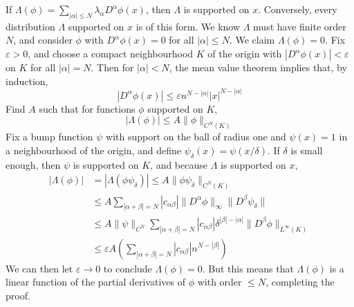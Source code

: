 \begin{example}
    If $\Lambda(\phi) = \sum_{|\alpha| \leq N} \lambda_\alpha D^\alpha \phi(x)$, then $\Lambda$ is supported on $x$. Conversely, every distribution $\Lambda$ supported on $x$ is of this form. We know $\Lambda$ must have finite order $N$, and consider $\phi$ with $D^\alpha \phi(x) = 0$ for all $|\alpha| \leq N$. We claim $\Lambda(\phi) = 0$. Fix $\varepsilon > 0$, and choose a compact neighbourhood $K$ of the origin with $|D^\alpha \phi(x)| < \varepsilon$ on $K$ for all $|\alpha| = N$. Then for $|\alpha| < N$, the mean value theorem implies that, by induction,
    \[ |D^\alpha \phi(x)| \leq \varepsilon n^{N - |\alpha|} |x|^{N-|\alpha|} \]
    Find $A$ such that for functions $\phi$ supported on $K$,
    \[ |\Lambda(\phi)| \leq A \| \phi \|_{C^N(K)} \]
    Fix a bump function $\psi$ with support on the ball of radius one and $\psi(x) = 1$ in a neighbourhood of the origin, and define $\psi_\delta(x) = \psi(x/\delta)$. If $\delta$ is small enough, then $\psi$ is supported on $K$, and because $\Lambda$ is supported on $x$,
    \begin{align*}
        |\Lambda(\phi)| &= |\Lambda(\phi \psi_\delta)| \leq A \| \phi \psi_\delta \|_{C^N(K)}\\
        &\leq A \sum_{|\alpha + \beta| = N} |c_{\alpha \beta}| \| D^\alpha \phi \|_\infty \| D^\beta \psi_\delta \|\\
        &\leq A \| \psi \|_{C^N} \sum_{|\alpha + \beta| = N} |c_{\alpha \beta}| \delta^{|\beta| - |\alpha|} \| D^\beta \phi \|_{L^\infty(K)}\\
        &\leq \varepsilon A \left( \sum_{|\alpha + \beta| = N} |c_{\alpha \beta}| n^{N - |\beta|} \right)
    \end{align*}
    We can then let $\varepsilon \to 0$ to conclude $\Lambda(\phi) = 0$. But this means that $\Lambda(\phi)$ is a linear function of the partial derivatives of $\phi$ with order $\leq N$, completing the proof.
\end{example}

